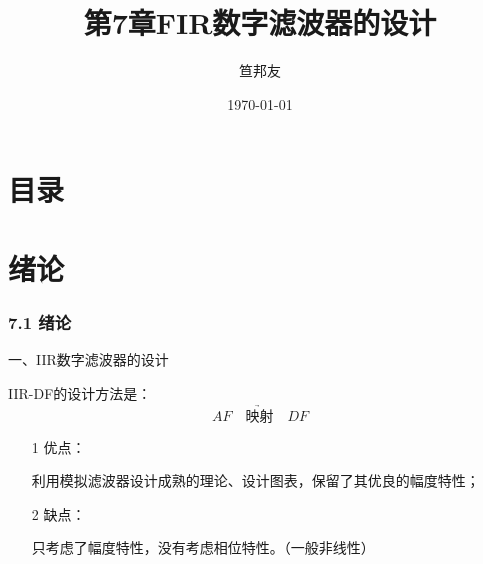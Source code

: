 \documentclass[notheorems,compress,mathserif,table]{beamer}
\title{\heiti 第7章\quad  FIR数字滤波器的设计}
\author[\textcolor{blue}]{{\sihao\kaishu  笪邦友}}
\institute{\sihao\lishu  \textcolor{violet}{中南民族大学~~ 电子信息工程学院}}
\date{\fangsong\today}
\begin{document}
	\kaishu
	\frame{ \titlepage }
	\section*{目录}
	
\section{绪论}
\begin{frame}\frametitle{7.1 绪论 }%
\begin{flushleft}
{\heiti 一、IIR数字滤波器的设计}
\end{flushleft}

    IIR-DF的设计方法是：
    $$AF\underrightarrow{\quad \mbox{映射}\quad }DF$$

    \begin{itemize}
      \item [1]优点：\par 利用模拟滤波器设计成熟的理论、设计图表，保留了其优良的幅度特性；
      \item [2]缺点：\par 只考虑了幅度特性，没有考虑相位特性。（一般非线性）
    \end{itemize}

\end{frame}
\end{document}
